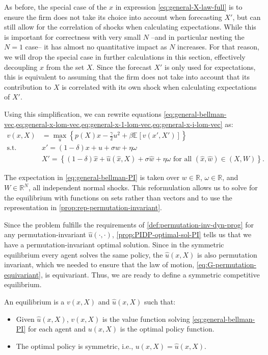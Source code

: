 \documentclass[12pt]{article}
\newcommand{\R}{\ensuremath{\mathbb{R}}}
\newcommand{\expec}[2][]{\ensuremath{\mathbb{E}_{{#1}}\left[ {#2} \right]}}
\begin{document}
As before, the special case of the $x$ in expression \cref{eq:general-X-law-full} is to ensure the firm does not take its choice into account when forecasting $X'$, but can still allow for the correlation of shocks when calculating expectations.  While this is important for correctness with very small $N$ --and in particular nesting the $N=1$ case-- it has almost no quantitative impact as $N$ increases. For that reason, we will drop the special case in further calculations in this section, effectively decoupling $x$ from the set $X$. Since the forecast $X'$ is only used for expectations, this is equivalent to assuming that the firm does not take into account that its contribution to $X$ is correlated with its own shock when calculating expectations of $X'$.

Using this simplification, we can rewrite equations \cref{eq:general-bellman-vec,eq:general-x-lom-vec,eq:general-x-1-lom-vec,eq:general-x-i-lom-vec} as: 
\begin{align}
v(x,X) &=\max_{u}\left\{p(X)x - \frac{\gamma}{2}u^2 + \beta \expec{v(x',X')}\right\}\label{eq:general-bellman-PI}\\
\text{s.t. } & x' = (1-\delta) x + u + \sigma w + \eta \omega\label{eq:general-x-lom}\\
& X' = \left\{(1-\delta)\hat{x} + \hat{u}(\hat{x},X) + \sigma \hat{w} + \eta \omega \text{ for all } (\hat{x},\hat{w}) \in (X,W)\right\}.\label{eq:general-X-law}
\end{align}
	
The expectation in \cref{eq:general-bellman-PI}  is taken over $w \in \R$, $\omega \in \R$, and $W \in \R^N$, all independent normal shocks. This reformulation allows us to solve for the equilibrium with functions on sets rather than vectors and to use the representation in \cref{prop:rep-permutation-invariant}.
	
Since the problem fulfills the requirements of \cref{def:permutation-inv-dyn-prog} for any permutation-invariant $\hat{u}(\cdot, \cdot)$, \cref{prop:PIDP-optimal-sol-PI} tells us that we have a permutation-invariant optimal solution. Since in the symmetric equilibrium every agent solves the same policy, the $\hat{u}(x,X)$ is also permutation invariant, which we needed to ensure that the law of motion, \cref{eq:G-permutation-equivariant}, is equivariant. Thus, we are ready to define a symmetric competitive equilibrium.

\begin{definition}
An equilibrium is a $v(x,X)$ and $\hat{u}(x,X)$ such that:
\begin{itemize}
\item Given $\hat{u}(x,X)$, $v(x,X)$ is the value function solving \cref{eq:general-bellman-PI} for each agent and $u(x,X)$ is the optimal policy function.
\item The optimal policy is symmetric, i.e., $u(x,X) = \hat{u}(x,X)$.
\end{itemize}
\end{definition}
\end{document}

